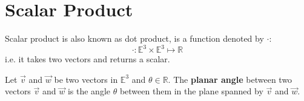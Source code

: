 \section{Scalar Product}

Scalar product is also known as dot product, is a function denoted by $\cdot$:
$$\boldsymbol{\cdot}: \mathbb{E}^3 \times \mathbb{E}^3 \mapsto \mathbb{R}$$
i.e. it takes two vectors and returns a scalar.

\begin{definition}
  Let $\vec{v}$ and $\vec{w}$ be two vectors in $\mathbb{E}^3$ and $\theta \in \mathbb{R}$.
  \newline \newline
  The {\bf planar angle} between two vectors $\vec{v}$ and $\vec{w}$ is the angle $\theta$ between them in the plane spanned by $\vec{v}$ and $\vec{w}$.
  
  \begin{figure}[H]
    \centering

\begin{tikzpicture}[x=0.75pt,y=0.75pt,yscale=-1,xscale=1]


\end{tikzpicture}
\end{figure}
\end{definition}
